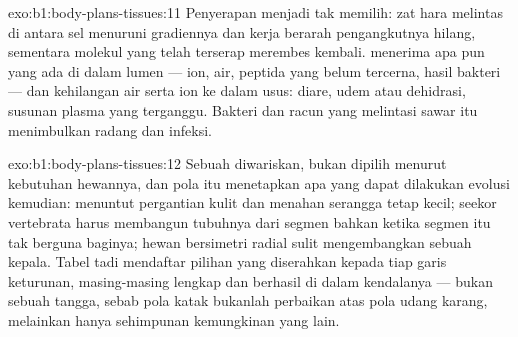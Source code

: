 \begin{solution}{exo:b1:body-plans-tissues:11}
Penyerapan menjadi tak memilih: zat hara melintas di antara sel
menuruni gradiennya dan kerja berarah pengangkutnya hilang, sementara
molekul yang telah terserap merembes kembali. 
menerima apa pun yang ada di dalam lumen --- ion, air, peptida yang
belum tercerna, hasil bakteri --- dan kehilangan air serta ion ke dalam
usus: diare, udem atau dehidrasi, susunan plasma yang terganggu.
Bakteri dan racun yang melintasi sawar itu menimbulkan radang dan
infeksi.
\end{solution}

\begin{solution}{exo:b1:body-plans-tissues:12}
Sebuah  diwariskan, bukan dipilih menurut kebutuhan hewannya,
dan pola itu menetapkan apa yang dapat dilakukan evolusi kemudian:
 menuntut pergantian kulit dan menahan serangga tetap kecil;
seekor vertebrata harus membangun tubuhnya dari segmen bahkan ketika
segmen itu tak berguna baginya; hewan bersimetri radial sulit
mengembangkan sebuah kepala. Tabel tadi mendaftar pilihan yang
diserahkan kepada tiap garis keturunan, masing-masing lengkap dan
berhasil di dalam kendalanya --- bukan sebuah tangga, sebab pola katak
bukanlah perbaikan atas pola udang karang, melainkan hanya sehimpunan
kemungkinan yang lain.
\end{solution}

